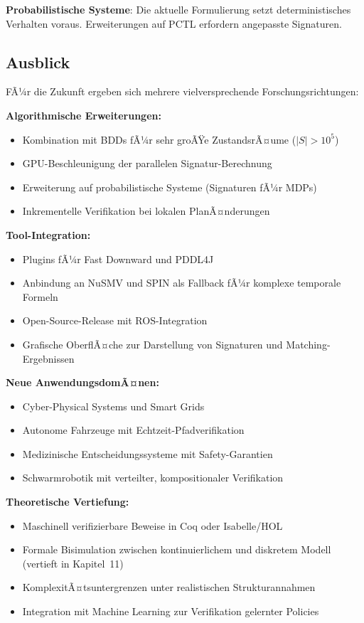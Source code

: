 ﻿\documentclass[a4paper,12pt]{article}
\theoremstyle{definition}
\begin{document}
\textbf{Probabilistische Systeme}: Die aktuelle Formulierung setzt deterministisches Verhalten voraus. Erweiterungen auf PCTL erfordern angepasste Signaturen.

\subsection{Ausblick}

FÃ¼r die Zukunft ergeben sich mehrere vielversprechende Forschungsrichtungen:

\textbf{Algorithmische Erweiterungen:}
\begin{itemize}
	\item[-] Kombination mit BDDs fÃ¼r sehr groÃŸe ZustandsrÃ¤ume ($|S| > 10^5$)
	\item[-] GPU-Beschleunigung der parallelen Signatur-Berechnung
	\item[-] Erweiterung auf probabilistische Systeme (Signaturen fÃ¼r MDPs)
	\item[-] Inkrementelle Verifikation bei lokalen PlanÃ¤nderungen
\end{itemize}

\textbf{Tool-Integration:}
\begin{itemize}
	\item[-] Plugins fÃ¼r Fast Downward und PDDL4J
	\item[-] Anbindung an NuSMV und SPIN als Fallback
	      fÃ¼r komplexe temporale Formeln
	\item[-] Open-Source-Release mit ROS-Integration
	\item[-] Grafische OberflÃ¤che zur Darstellung
	      von Signaturen und Matching-Ergebnissen
\end{itemize}

\textbf{Neue AnwendungsdomÃ¤nen:}
\begin{itemize}
	\item[-] Cyber-Physical Systems und Smart Grids
	\item[-] Autonome Fahrzeuge mit Echtzeit-Pfadverifikation
	\item[-] Medizinische Entscheidungssysteme mit Safety-Garantien
	\item[-] Schwarmrobotik mit verteilter, kompositionaler Verifikation
\end{itemize}

\textbf{Theoretische Vertiefung:}
\begin{itemize}
	\item[-] Maschinell verifizierbare Beweise in Coq oder Isabelle/HOL
	\item[-] Formale Bisimulation zwischen kontinuierlichem und diskretem Modell (vertieft in Kapitel~11)
	\item[-] KomplexitÃ¤tsuntergrenzen unter realistischen Strukturannahmen
	\item[-] Integration mit Machine Learning zur Verifikation gelernter Policies
\end{itemize}
\end{document}
